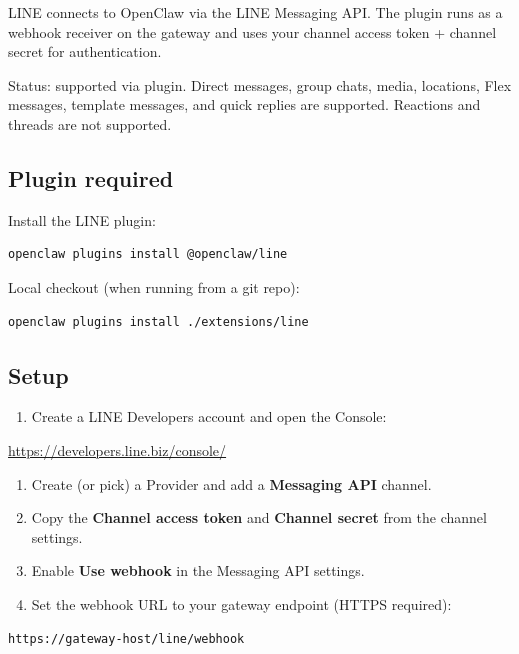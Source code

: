 LINE connects to OpenClaw via the LINE Messaging API. The plugin runs as a webhook
receiver on the gateway and uses your channel access token + channel secret for
authentication.

Status: supported via plugin. Direct messages, group chats, media, locations, Flex
messages, template messages, and quick replies are supported. Reactions and threads
are not supported.

\subsection{Plugin required}


Install the LINE plugin:

\begin{lstlisting}[language=bash]
openclaw plugins install @openclaw/line
\end{lstlisting}


Local checkout (when running from a git repo):

\begin{lstlisting}[language=bash]
openclaw plugins install ./extensions/line
\end{lstlisting}


\subsection{Setup}


\begin{enumerate}
  \item Create a LINE Developers account and open the Console:
\end{enumerate}

\href{https://developers.line.biz/console/}{https://developers.line.biz/console/}
\begin{enumerate}
  \item Create (or pick) a Provider and add a \textbf{Messaging API} channel.
  \item Copy the \textbf{Channel access token} and \textbf{Channel secret} from the channel settings.
  \item Enable \textbf{Use webhook} in the Messaging API settings.
  \item Set the webhook URL to your gateway endpoint (HTTPS required):
\end{enumerate}


\begin{lstlisting}
https://gateway-host/line/webhook
\end{lstlisting}


